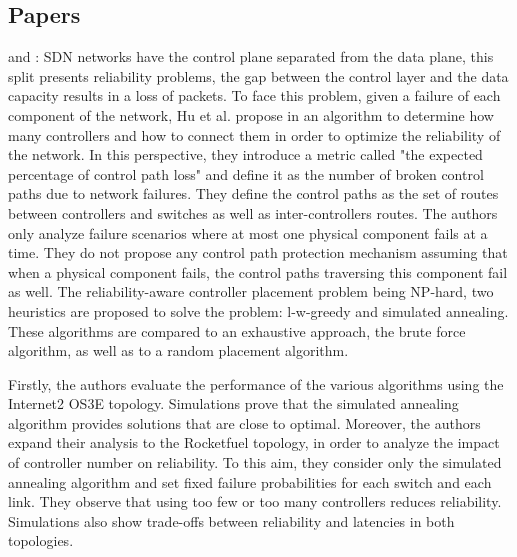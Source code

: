 \documentclass[a4paper,10pt]{article}
\begin{document}


\subsection{Papers}

\cite{HuWe13} and \cite{HuWa12}: SDN networks have the control plane separated from the data plane, this split presents reliability problems, the gap between the control layer and the data capacity results in a loss of packets. To face this problem,  given a failure of each component of the network, Hu et al. propose in \cite{HuWa12,HuWe13} an algorithm to determine how many controllers and how to connect them in order to optimize the reliability of the network. In this perspective, they introduce a metric called "the expected percentage of control path loss" and define it  as the number of broken control paths due to network failures. They define the control paths as the set of routes between controllers and switches as well as inter-controllers routes. The authors only analyze failure scenarios where at most one physical component fails at a time. They do not propose any control path protection mechanism assuming that when a physical component fails, the control paths traversing this component fail as well. The reliability-aware controller placement problem being NP-hard, two heuristics are proposed to solve the problem: l-w-greedy and simulated annealing. These algorithms are compared to an exhaustive approach, the brute force algorithm, as well as to a random placement algorithm. 

Firstly, the authors evaluate the performance of the various algorithms using the Internet2 OS3E topology. Simulations prove that the simulated annealing algorithm provides solutions that are close to optimal. Moreover, the authors expand their analysis to the Rocketfuel topology, in order to analyze the impact of controller number on reliability. To this aim, they consider only the simulated annealing algorithm and set fixed failure probabilities for each switch and each link. They observe that using too few or too many controllers reduces reliability. Simulations also show trade-offs between reliability and latencies in both topologies.
\end{document}
